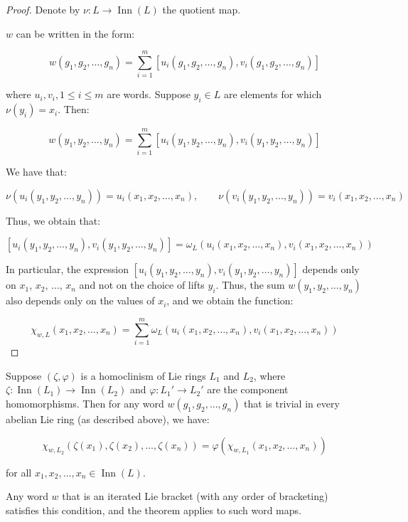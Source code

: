 \begin{proof}
  Denote by $\nu:L \to \operatorname{Inn}(L)$ the quotient map.

  $w$ can be written in the form:

  $$w(g_1,g_2,\dots,g_n) = \sum_{i=1}^m [u_i(g_1,g_2,\dots,g_n),v_i(g_1,g_2,\dots,g_n)]$$

  where $u_i,v_i, 1 \le i \le m$ are words. Suppose $y_i \in L$ are
  elements for which $\nu(y_i) = x_i$. Then:

  $$w(y_1,y_2,\dots,y_n) = \sum_{i=1}^m [u_i(y_1,y_2,\dots,y_n),v_i(y_1,y_2,\dots,y_n)]$$

  We have that:

  $$\nu(u_i(y_1,y_2,\dots,y_n)) = u_i(x_1,x_2,\dots,x_n), \qquad \nu(v_i(y_1,y_2,\dots,y_n)) = v_i(x_1,x_2,\dots,x_n)$$

  Thus, we obtain that:

  $$[u_i(y_1,y_2,\dots,y_n),v_i(y_1,y_2,\dots,y_n)] = \omega_L(u_i(x_1,x_2,\dots,x_n),v_i(x_1,x_2,\dots,x_n))$$

  In particular, the expression
  $[u_i(y_1,y_2,\dots,y_n),v_i(y_1,y_2,\dots,y_n)]$ depends only on
  $x_1$, $x_2$, $\dots$, $x_n$ and not on the choice of lifts $y_i$. Thus, the
  sum $w(y_1,y_2,\dots,y_n)$ also depends only on the values of
  $x_i$, and we obtain the function:

  $$\chi_{w,L}(x_1,x_2,\dots,x_n) = \sum_{i=1}^m \omega_L(u_i(x_1,x_2,\dots,x_n),v_i(x_1,x_2,\dots,x_n))$$
\end{proof}

\begin{theorem}\label{thm:iterated-bracket-commutes-homoclinisms}
  Suppose $(\zeta,\varphi)$ is a homoclinism of Lie rings $L_1$ and
  $L_2$, where $\zeta:\operatorname{Inn}(L_1) \to
  \operatorname{Inn}(L_2)$ and $\varphi:L_1' \to L_2'$ are the
  component homomorphisms. Then for any word $w(g_1,g_2,\dots,g_n)$
  that is trivial in every abelian Lie ring (as described above), we have:

  $$\chi_{w,L_2}(\zeta(x_1),\zeta(x_2),\dots,\zeta(x_n)) = \varphi(\chi_{w,L_1}(x_1,x_2,\dots,x_n))$$

  for all $x_1,x_2,\dots,x_n \in \operatorname{Inn}(L)$.

  Any word $w$ that is an iterated Lie bracket (with any order of
  bracketing) satisfies this condition, and the theorem applies to
  such word maps.
\end{theorem}

